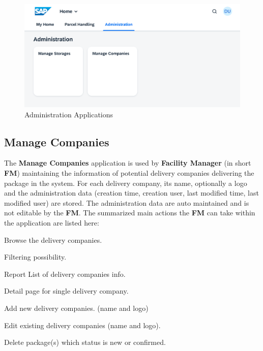 \begin{figure}[H]
	\centering
	\includegraphics[width=1\linewidth]{images/user_doc/overviews/AdminTab.png}
	\caption{Administration Applications}
	\label{fig:AdministrationApplications}
\end{figure}


\subsection{Manage Companies}
\label{subsec:mc}

The \textbf{Manage Companies} application is used by \textbf{Facility Manager} (in short \textbf{FM}) maintaining the information of potential delivery companies delivering the package in the system. For each delivery company, its name, optionally a logo and the administration data (creation time, creation user, last modified time, last modified user) are stored. The administration data are auto maintained and is not editable by the \textbf{FM}. The summarized main actions the \textbf{FM} can take within the application are listed here:

\begin{compactenum}
	\item Browse the delivery companies.
        \begin{compactenum}
            \item Filtering possibility.
            \item Report List of delivery companies info.
            \item Detail page for single delivery company.
        \end{compactenum}
    \item Add new delivery companies. (name and logo)
    \item Edit existing delivery companies (name and logo).
    \item Delete package(s) which status is new or confirmed.
\end{compactenum}

